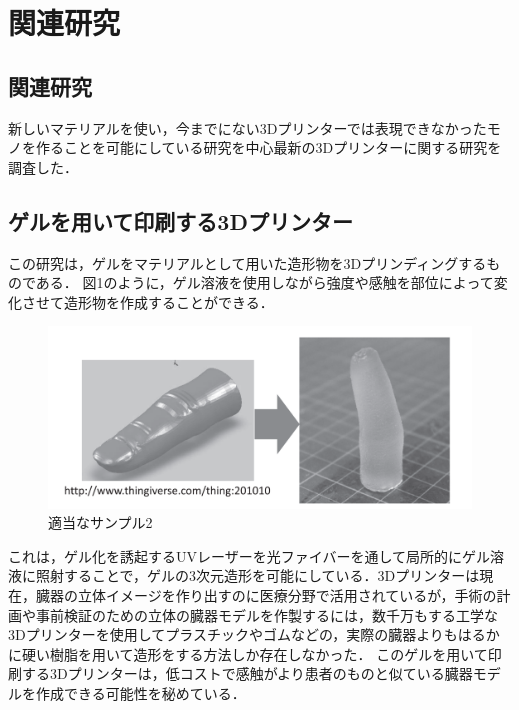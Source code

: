 \chapter{関連研究}
\label{chp:first}

\section{関連研究}
\label{sec:paragraph}
新しいマテリアルを使い，今までにない3Dプリンターでは表現できなかったモノを作ることを可能にしている研究を中心最新の3Dプリンターに関する研究を調査した．


\section{ゲルを用いて印刷する3Dプリンター\cite{a}}
\label{sec:enum}

この研究は，ゲルをマテリアルとして用いた造形物を3Dプリンディングするものである．
図1のように，ゲル溶液を使用しながら強度や感触を部位によって変化させて造形物を作成することができる．

\begin{figure}[H]
  \centering
  \includegraphics[width=14truecm]{./fig/ゲルを用いて印刷する3Dプリンター.png}
  \caption{適当なサンプル2}
  \label{fig:ゲル}
\end{figure}

これは，ゲル化を誘起するUVレーザーを光ファイバーを通して局所的にゲル溶液に照射することで，ゲルの3次元造形を可能にしている．3Dプリンターは現在，臓器の立体イメージを作り出すのに医療分野で活用されているが，手術の計画や事前検証のための立体の臓器モデルを作製するには，数千万もする工学な3Dプリンターを使用してプラスチックやゴムなどの，実際の臓器よりもはるかに硬い樹脂を用いて造形をする方法しか存在しなかった．
このゲルを用いて印刷する3Dプリンターは，低コストで感触がより患者のものと似ている臓器モデルを作成できる可能性を秘めている．


